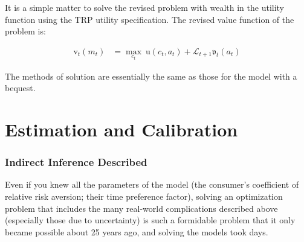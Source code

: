 \documentclass{article}
\newcommand{\uFunc}{\mathrm{u}}
\newcommand{\vFunc}{\mathrm{v}}
\newcommand{\Alive}{\mathcal{L}}
\newcommand{\tranShkEmp}{\xi}
\newcommand{\cNrm}{c}
\newcommand{\RNrm}{\mathcal{R}}
\newcommand{\aNrm}{a}
\newcommand{\mNrm}{m}
\begin{document}
It is a simple matter to solve the revised problem with wealth in the utility function using the TRP utility specification. The revised value function of the problem is:


\begin{align}
    {\vFunc}_{t}({\mNrm}_{t}) & = \max_{\cNrm_{t}} ~ \uFunc(\cNrm_{t}, \aNrm_{t})+\Alive_{t+1}\mathfrak{v}_{t}(a_{t})
\end{align}

The methods of solution are essentially the same as those for the model with a bequest.


\section{Estimation and Calibration}

\subsubsection{Indirect Inference Described}

Even if you knew all the parameters of the model (the consumer's coefficient of relative risk aversion; their time preference factor), solving an optimization problem that includes the many real-world complications described above (especially those due to uncertainty) is such a formidable problem that it only became possible about 25 years ago, and solving the models took days.
\end{document}
